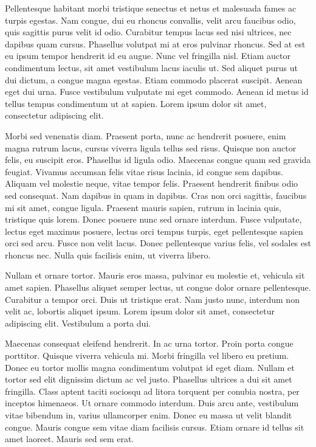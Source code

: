 \documentclass{article}
\begin{document}
Pellentesque habitant morbi tristique senectus et netus et malesuada fames ac turpis egestas. Nam congue, dui eu rhoncus convallis, velit arcu faucibus odio, quis sagittis purus velit id odio. Curabitur tempus lacus sed nisi ultrices, nec dapibus quam cursus. Phasellus volutpat mi at eros pulvinar rhoncus. Sed at est eu ipsum tempor hendrerit id eu augue. Nunc vel fringilla nisl. Etiam auctor condimentum lectus, sit amet vestibulum lacus iaculis ut. Sed aliquet purus ut dui dictum, a congue magna egestas. Etiam commodo placerat suscipit. Aenean eget dui urna. Fusce vestibulum vulputate mi eget commodo. Aenean id metus id tellus tempus condimentum ut at sapien. Lorem ipsum dolor sit amet, consectetur adipiscing elit.

Morbi sed venenatis diam. Praesent porta, nunc ac hendrerit posuere, enim magna rutrum lacus, cursus viverra ligula tellus sed risus. Quisque non auctor felis, eu suscipit eros. Phasellus id ligula odio. Maecenas congue quam sed gravida feugiat. Vivamus accumsan felis vitae risus lacinia, id congue sem dapibus. Aliquam vel molestie neque, vitae tempor felis. Praesent hendrerit finibus odio sed consequat. Nam dapibus in quam in dapibus. Cras non orci sagittis, faucibus mi sit amet, congue ligula. Praesent mauris sapien, rutrum in lacinia quis, tristique quis lorem. Donec posuere nunc sed ornare interdum. Fusce vulputate, lectus eget maximus posuere, lectus orci tempus turpis, eget pellentesque sapien orci sed arcu. Fusce non velit lacus. Donec pellentesque varius felis, vel sodales est rhoncus nec. Nulla quis facilisis enim, ut viverra libero.

Nullam et ornare tortor. Mauris eros massa, pulvinar eu molestie et, vehicula sit amet sapien. Phasellus aliquet semper lectus, ut congue dolor ornare pellentesque. Curabitur a tempor orci. Duis ut tristique erat. Nam justo nunc, interdum non velit ac, lobortis aliquet ipsum. Lorem ipsum dolor sit amet, consectetur adipiscing elit. Vestibulum a porta dui.

Maecenas consequat eleifend hendrerit. In ac urna tortor. Proin porta congue porttitor. Quisque viverra vehicula mi. Morbi fringilla vel libero eu pretium. Donec eu tortor mollis magna condimentum volutpat id eget diam. Nullam et tortor sed elit dignissim dictum ac vel justo. Phasellus ultrices a dui sit amet fringilla. Class aptent taciti sociosqu ad litora torquent per conubia nostra, per inceptos himenaeos. Ut ornare commodo interdum. Duis arcu ante, vestibulum vitae bibendum in, varius ullamcorper enim. Donec eu massa ut velit blandit congue. Mauris congue sem vitae diam facilisis cursus. Etiam ornare id tellus sit amet laoreet. Mauris sed sem erat.
\end{document}
